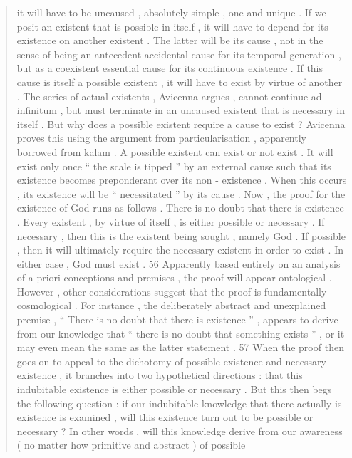 \begin{quote}
it will have to be uncaused , absolutely simple , one and unique . If we posit an existent that is possible in itself , it will have to depend for its existence on another existent . The latter will be its cause , not in the sense of being an antecedent accidental cause for its temporal generation , but as a coexistent essential cause for its continuous existence . If this cause is itself a possible existent , it will have to exist by virtue of another . The series of actual existents , Avicenna argues , cannot continue ad infinitum , but must terminate in an uncaused existent that is necessary in itself . But why does a possible existent require a cause to exist ? Avicenna proves this using the argument from particularisation , apparently borrowed from kalām . A possible existent can exist or not exist . It will exist only once “ the scale is tipped ” by an external cause such that its existence becomes preponderant over its non - existence . When this occurs , its existence will be “ necessitated ” by its cause . Now , the proof for the existence of God runs as follows . There is no doubt that there is existence . Every existent , by virtue of itself , is either possible
or necessary . If necessary , then this is the existent being sought , namely God . If possible , then it will ultimately require the necessary existent in order to exist . In either case , God must exist . 56 Apparently based entirely on an analysis of a priori conceptions and premises , the proof will appear ontological . However , other considerations suggest that the proof is fundamentally cosmological . For instance , the deliberately abstract and unexplained premise , “ There is no doubt that there is existence ” , appears to derive from our knowledge that “ there is no doubt that something exists ” , or it may even mean the same as the latter statement . 57 When the proof then goes on to appeal to the dichotomy of possible existence and necessary existence , it branches into two hypothetical directions : that this indubitable existence is either possible or necessary . But this then begs the following question : if our indubitable knowledge that there actually is existence is examined , will this existence turn out to be possible or necessary ? In other words , will this knowledge derive from our awareness ( no matter how primitive and abstract ) of possible

\end{quote}
